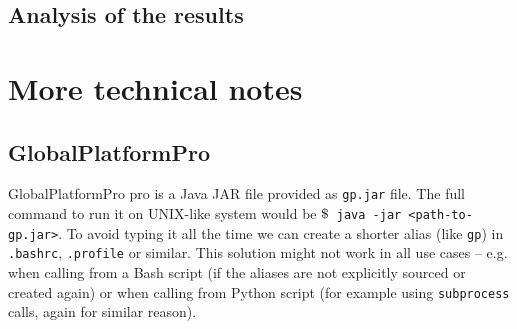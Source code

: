 \documentclass[a4paper]{scrartcl}
\newcommand{\dollar}{\mbox{\textdollar}}
\begin{document}
\subsection{Analysis of the results}

\section*{More technical notes}

\subsection{GlobalPlatformPro}

GlobalPlatformPro pro is a Java JAR file provided as \texttt{gp.jar} file. The full command to run it on UNIX-like system would be \texttt{$\dollar$ java -jar <path-to-gp.jar>}. To avoid typing it all the time we can create a shorter alias (like \texttt{gp}) in \texttt{.bashrc}, \texttt{.profile} or similar. This solution might not work in all use cases -- e.g. when calling from a Bash script (if the aliases are not explicitly sourced or created again) or when calling from Python script (for example using \texttt{subprocess} calls, again for similar reason).
\end{document}
